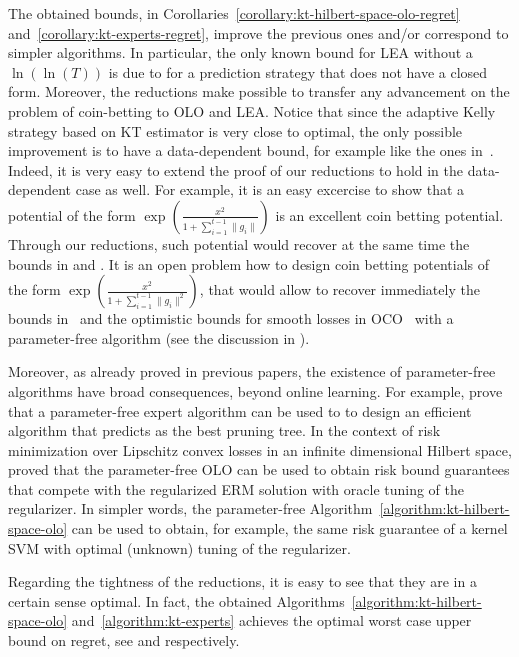 The obtained bounds, in Corollaries~\ref{corollary:kt-hilbert-space-olo-regret}
and~\ref{corollary:kt-experts-regret}, improve the previous ones and/or correspond to simpler algorithms.
In particular, the only known bound for \ac{LEA} without a $\ln(\ln(T))$ is due to \citet{ChernovV10} for a prediction strategy that does not have a closed form.
Moreover, the reductions make possible to transfer any advancement on the
problem of coin-betting to \ac{OLO} and \ac{LEA}. Notice that since the adaptive
Kelly strategy based on \ac{KT} estimator is very close to optimal, the only
possible improvement is to have a data-dependent bound, for example like the
ones in~\cite{KoolenE15}. Indeed, it is very easy to extend the proof of our
reductions to hold in the data-dependent case as well. For example, it is an easy excercise to show that a
potential of the form $\exp \left(\frac{x^2}{1+\sum_{i=1}^{t-1}
\|g_{i}\|}\right)$ is an excellent coin betting potential. Through our
reductions, such potential would recover at the same time the bounds in
\citet{LuoS15} and \citet{Orabona14}. It is an open problem how to design coin betting potentials of the form $\exp \left(\frac{x^2}{1+\sum_{i=1}^{t-1} \|g_{i}\|^2}\right)$, that would allow to recover immediately the bounds in~\citet{KoolenE15} and the
optimistic bounds for smooth losses in \ac{OCO}~\citep{SrebroST10} with a parameter-free algorithm (see the discussion in \citet{Orabona14}).

Moreover, as already proved in previous papers, the existence of parameter-free
algorithms have broad consequences, beyond online learning. For example, \citet{LuoS15} prove that a
parameter-free expert algorithm can be used to to design an efficient algorithm
that predicts as the best pruning tree. In the context of risk minimization over
Lipschitz convex losses in an infinite dimensional Hilbert space,
\citet{Orabona14} proved that the parameter-free \ac{OLO} can be used to obtain
risk bound guarantees that compete with the regularized \acl{ERM} solution with
oracle tuning of the regularizer. In simpler words, the parameter-free
Algorithm~\ref{algorithm:kt-hilbert-space-olo} can be used to obtain, for
example, the same risk guarantee of a kernel \acl{SVM} with optimal (unknown)
tuning of the regularizer.

Regarding the tightness of the reductions, it is easy to see that they are in a
certain sense optimal. In fact, the obtained
Algorithms~\ref{algorithm:kt-hilbert-space-olo} and~\ref{algorithm:kt-experts}
achieves the optimal worst case upper bound on regret, see \citet{Orabona13} and
\citet{Cesa-BianchiL06} respectively.